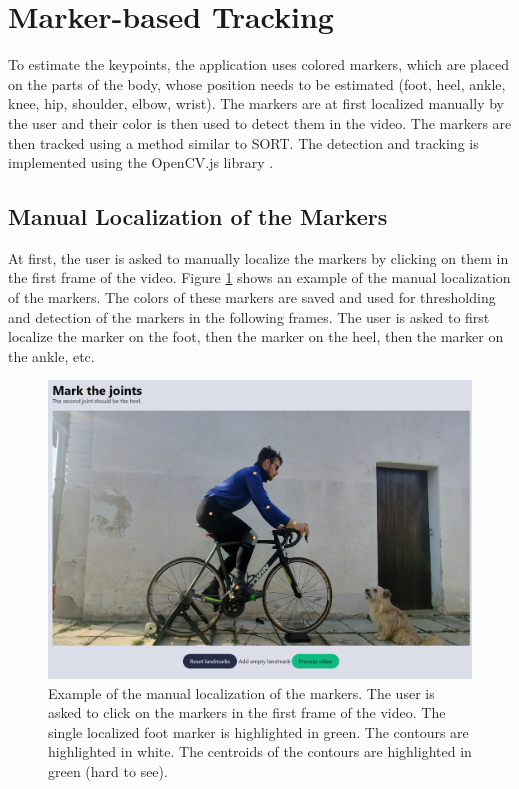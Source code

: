 \section{Marker-based Tracking}
\label{marker_based_tracking}
To estimate the keypoints, the application uses colored markers, which are placed on the parts of the body, whose position needs to be estimated (foot, heel, ankle, knee, hip, shoulder, elbow, wrist). The markers are at first localized manually by the user and their color is then used to detect them in the video. The markers are then tracked using a method similar to SORT. The detection and tracking is implemented using the OpenCV.js library \cite{opencvjs}.


\subsection{Manual Localization of the Markers}
\label{manual_localization_of_the_markers}
At first, the user is asked to manually localize the markers by clicking on them in the first frame of the video. Figure \ref{fig:marker_localization} shows an example of the manual localization of the markers. The colors of these markers are saved and used for thresholding and detection of the markers in the following frames. The user is asked to first localize the marker on the foot, then the marker on the heel, then the marker on the ankle, etc.

\begin{figure}[htbp]
    \centering
    \includegraphics[width=\textwidth]{obrazky-figures/markers_localization.png}
    \caption{Example of the manual localization of the markers. The user is asked to click on the markers in the first frame of the video. The single localized foot marker is highlighted in green. The contours are highlighted in white. The centroids of the contours are highlighted in green (hard to see).}
    \label{fig:marker_localization}
\end{figure}


